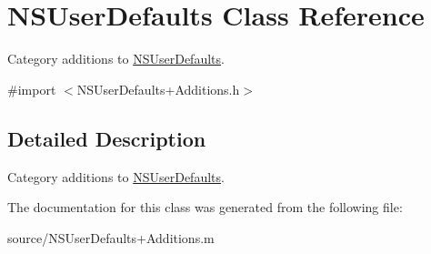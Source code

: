 \hypertarget{class_n_s_user_defaults}{
\section{NSUserDefaults Class Reference}
\label{class_n_s_user_defaults}
}


Category additions to \hyperlink{class_n_s_user_defaults}{NSUserDefaults}.  


{\ttfamily \#import $<$NSUserDefaults+Additions.h$>$}

\subsection{Detailed Description}
Category additions to \hyperlink{class_n_s_user_defaults}{NSUserDefaults}. 

The documentation for this class was generated from the following file:\begin{DoxyCompactItemize}
\item 
source/NSUserDefaults+Additions.m\end{DoxyCompactItemize}
